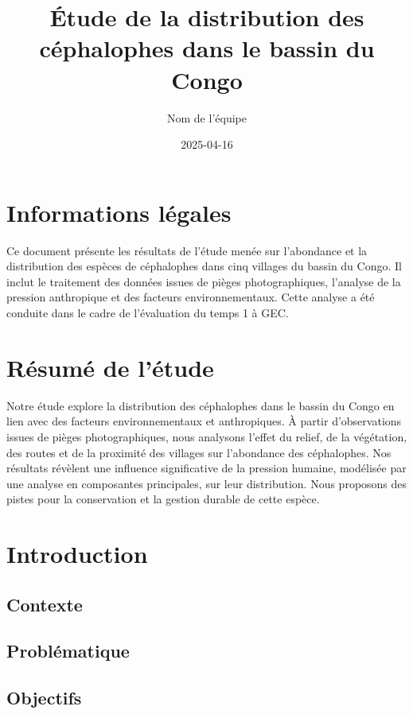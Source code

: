 \documentclass[
]{article}
\title{Étude de la distribution des céphalophes dans le bassin du Congo}
\author{Nom de l'équipe}
\date{2025-04-16}
\begin{document}
\maketitle

{
\setcounter{tocdepth}{2}
\tableofcontents
}
\section{Informations légales}\label{informations-luxe9gales}

Ce document présente les résultats de l'étude menée sur l'abondance et la distribution des espèces de céphalophes dans cinq villages du bassin du Congo. Il inclut le traitement des données issues de pièges photographiques, l'analyse de la pression anthropique et des facteurs environnementaux. Cette analyse a été conduite dans le cadre de l'évaluation du temps 1 à GEC.

\section{Résumé de l'étude}\label{ruxe9sumuxe9-de-luxe9tude}

Notre étude explore la distribution des céphalophes dans le bassin du Congo en lien avec des facteurs environnementaux et anthropiques. À partir d'observations issues de pièges photographiques, nous analysons l'effet du relief, de la végétation, des routes et de la proximité des villages sur l'abondance des céphalophes. Nos résultats révèlent une influence significative de la pression humaine, modélisée par une analyse en composantes principales, sur leur distribution. Nous proposons des pistes pour la conservation et la gestion durable de cette espèce.

\section{Introduction}\label{introduction}

\subsection{Contexte}\label{contexte}

\subsection{Problématique}\label{probluxe9matique}

\subsection{Objectifs}\label{objectifs}
\end{document}
